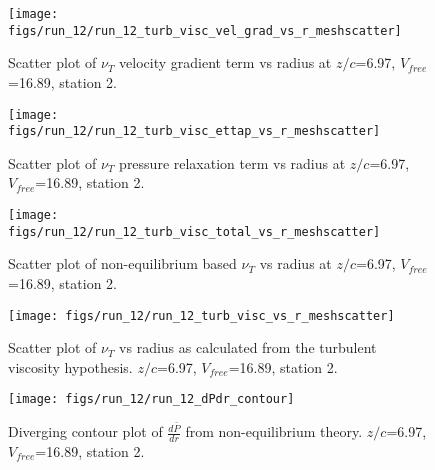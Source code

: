 \begin{figure}[H]
\centering
\texttt{[image: figs/run\_12/run\_12\_turb\_visc\_vel\_grad\_vs\_r\_meshscatter]}
\caption{Scatter plot of $\nu_T$ velocity gradient term vs radius at $z/c$=6.97, $V_{free}$=16.89, station 2.}
\end{figure}


\begin{figure}[H]
\centering
\texttt{[image: figs/run\_12/run\_12\_turb\_visc\_ettap\_vs\_r\_meshscatter]}
\caption{Scatter plot of $\nu_T$ pressure relaxation term vs radius at $z/c$=6.97, $V_{free}$=16.89, station 2.}
\end{figure}


\begin{figure}[H]
\centering
\texttt{[image: figs/run\_12/run\_12\_turb\_visc\_total\_vs\_r\_meshscatter]}
\caption{Scatter plot of non-equilibrium based $\nu_T$ vs radius at $z/c$=6.97, $V_{free}$=16.89, station 2.}
\end{figure}


\begin{figure}[H]
\centering
\texttt{[image: figs/run\_12/run\_12\_turb\_visc\_vs\_r\_meshscatter]}
\caption{Scatter plot of $\nu_T$ vs radius as calculated from the turbulent viscosity hypothesis. $z/c$=6.97, $V_{free}$=16.89, station 2.}
\end{figure}


\begin{figure}[H]
\centering
\texttt{[image: figs/run\_12/run\_12\_dPdr\_contour]}
\caption{Diverging contour plot of $\frac{d\bar{P}}{dr}$ from non-equilibrium theory. $z/c$=6.97, $V_{free}$=16.89, station 2.}
\end{figure}


